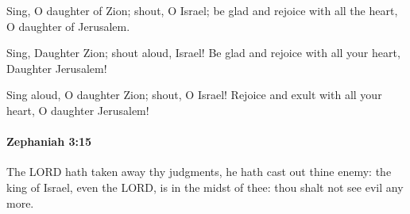 			\begin{versebox}
					\item[BHS] 
					\item[LXX] 
					\item[ASV] Sing, O daughter of Zion; shout, O Israel; be glad and rejoice with all the heart, O daughter of Jerusalem.
					\item[NIV] Sing, Daughter Zion; shout aloud, Israel! Be glad and rejoice with all your heart, Daughter Jerusalem!
					\item[NRSV] Sing aloud, O daughter Zion; shout, O Israel! Rejoice and exult with all your heart, O daughter Jerusalem!
			\end{versebox}

		\paragraph{Zephaniah 3:15} %
			\label{ZEPHANIAH-3-15}

			The LORD hath taken away thy judgments, he hath cast out thine enemy: the king of Israel, even the LORD, is in the midst of thee: thou shalt not see evil any more.

